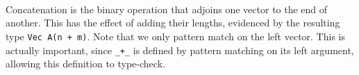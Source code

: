 \begin{code}%
\>[0]\AgdaSpace{}%
\AgdaSymbol{:}%
\>[111I]\AgdaSymbol{\{}\AgdaSpace{}%
\AgdaSpace{}%
\AgdaSymbol{:}\AgdaSpace{}%
\AgdaSymbol{\}\{}\AgdaSpace{}%
\AgdaSymbol{:}\AgdaSpace{}%
\AgdaSymbol{\}}\AgdaSpace{}%
\<%
\\
\>[.][@{}l@{}]\<[111I]%
\>[16]\AgdaSpace{}%
\AgdaSymbol{(}\AgdaSpace{}%
\AgdaSpace{}%
\AgdaSymbol{)}\AgdaSpace{}%
\AgdaSpace{}%
\AgdaSpace{}%
\AgdaSpace{}%
\AgdaSpace{}%
\AgdaSpace{}%
\AgdaSpace{}%
\AgdaSpace{}%
\AgdaSpace{}%
\<%
\\
\>[0]\AgdaSpace{}%
\AgdaInductiveConstructor{[]}\AgdaSpace{}%
\AgdaInductiveConstructor{[]}\AgdaSpace{}%
\AgdaSymbol{=}\AgdaSpace{}%
\AgdaInductiveConstructor{[]}\<%
\\
\>[0]\AgdaSpace{}%
\AgdaSymbol{(}\AgdaSpace{}%
\AgdaOperator{\AgdaInductiveConstructor{::}}\AgdaSpace{}%
\AgdaSymbol{)}\AgdaSpace{}%
\AgdaSymbol{(}\AgdaSpace{}%
\AgdaOperator{\AgdaInductiveConstructor{::}}\AgdaSpace{}%
\AgdaSymbol{)}\AgdaSpace{}%
\AgdaSymbol{=}\AgdaSpace{}%
\AgdaSpace{}%
\AgdaSpace{}%
\AgdaOperator{\AgdaInductiveConstructor{::}}\AgdaSpace{}%
\AgdaSpace{}%
\AgdaSpace{}%
\<%
\end{code}
Concatenation is the binary operation that adjoins one vector to the end of another.
This has the effect of adding their lengths, evidenced by the resulting type \texttt{Vec~A(n~+~m)}.
Note that we only pattern match on the left vector. This is actually important, since \texttt{\_+\_} is defined
by pattern matching on its left argument, allowing this definition to type-check.
